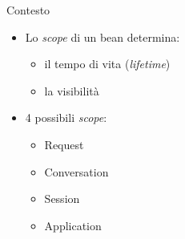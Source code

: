 \begin{frame}{Contesto}

\begin{itemize}
\item Lo \textsl{scope} di un bean determina:

	\begin{itemize}
	
	\vspace{0.5em}
	
	\item il tempo di vita (\textsl{lifetime})
	
	\vspace{0.8em}
	
	\item la visibilità
	\end{itemize}

\vspace{1em}

\item 4 possibili \textsl{scope}:
	\begin{itemize}
	
	\vspace{0.5em}
	
	\item Request
	
	\vspace{0.8em}
	
	\item Conversation
	
	\vspace{0.8em}
	
	\item Session
	
	\vspace{0.8em}
	
	\item Application
	\end{itemize}

\end{itemize}

\end{frame}



